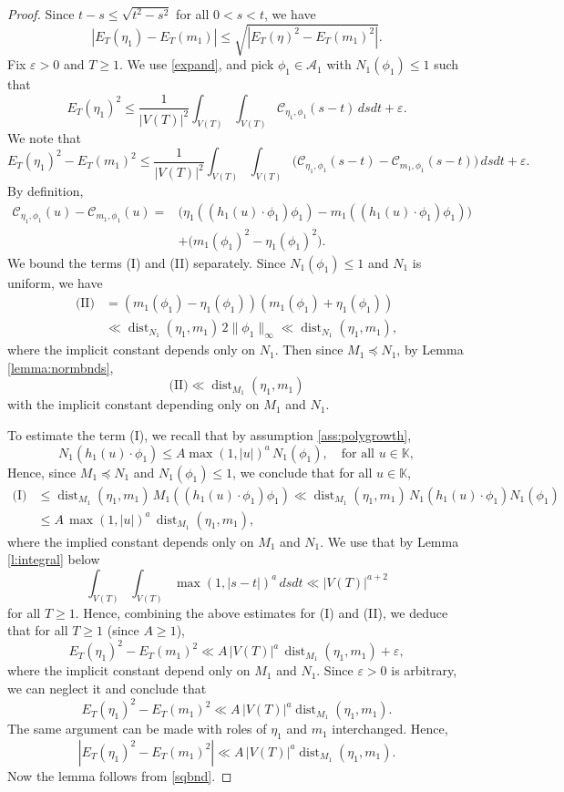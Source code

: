 \documentclass[11pt,reqno,a4paper]{amsart}
\numberwithin{equation}{section}
\newcommand{\cA}{\mathcal{A}}
\newcommand{\cC}{\mathcal{C}}
\newcommand{\eps}{\varepsilon}
\DeclareMathOperator{\dist}{dist}
\theoremstyle{theorem}
\theoremstyle{definition}
\begin{document}
\begin{proof}
Since $t-s \leq \sqrt{t^2 - s^2}$ for all $0 < s < t$, we have
\begin{equation}
\label{sqbnd}
|E_T(\eta_1) - E_T(m_1)| \leq \sqrt{|E_T(\eta)^2 - E_T(m_1)^2|}.
\end{equation}
Fix $\eps > 0$ and $T \geq 1$. We use \eqref{expand}, and pick $\phi_1 \in \cA_1$ with $N_1(\phi_1) \leq 1$ such that
\[
E_T(\eta_1)^2 \leq \frac{1}{|V(T)|^2} \int_{V(T)} \int_{V(T)}\cC_{\eta_1,\phi_1}(s-t) \, ds dt + \eps.
\]
We note that
\[
E_T(\eta_1)^2 - E_T(m_1)^2 \leq \frac{1}{|V(T)|^2} \int_{V(T)} \int_{V(T)} \big(\cC_{\eta_1,\phi_1}(s-t) -\cC_{m_1,\phi_1}(s-t) \big) \, ds dt + \eps.
\]
By definition, 
\begin{align}
\cC_{\eta_1,\phi_1}(u) -\cC_{m_1,\phi_1}(u)
=&
\big( \eta_1((h_1(u) \cdot \phi_1) \phi_1) - m_1((h_1(u) \cdot \phi_1) \phi_1) \big) \tag{I} \\
&+
\big( m_1(\phi_1)^2 - \eta_1(\phi_1)^2 \big) \tag{II}.
\end{align}
We bound the terms (I) and (II) separately.
Since $N_1(\phi_1) \leq 1$ and $N_1$ is uniform, we have
\begin{align*}
\textrm{(II)}&= (m_1(\phi_1) - \eta_1(\phi_1))(m_1(\phi_1)+ \eta_1(\phi_1))\\
&\ll \dist_{N_1}(\eta_1,m_1)\, 2\|\phi_1\|_\infty \ll \dist_{N_1}(\eta_1,m_1),
\end{align*}
where the implicit constant depends only on $N_1$.
Then since $M_1 \preceq N_1$, by Lemma \ref{lemma:normbnds},
\begin{equation}
\label{eq:II}
\textrm{(II)} \ll \dist_{M_1}(\eta_1,m_1)
\end{equation}
with the implicit constant depending only on $M_1$ and $N_1$.

To estimate the term (I), we recall that by assumption \eqref{ass:polygrowth}, 
\[
N_1(h_1(u) \cdot \phi_1) \le A \max(1,|u|)^a\, N_1(\phi_1), \quad \textrm{for all $u\in\mathbb{K}$},
\]
Hence, since $M_1 \preceq N_1$ and $N_1(\phi_1) \leq 1$, we conclude that for all $u\in\mathbb{K}$,
\begin{align}\label{eq:I}
\textrm{(I)} &\leq \dist_{M_1}(\eta_1,m_1) \, M_1((h_1(u)\cdot  \phi_1)\phi_1) \ll 
\dist_{M_1}(\eta_1,m_1)\,N_1(h_1(u) \cdot \phi_1) N_1(\phi_1) \\
&\le A\, \max(1,|u|)^a \, \dist_{M_1}(\eta_1,m_1),\nonumber
\end{align}
where the implied constant depends only on $M_1$ and $N_1$.
We use that by Lemma \ref{l:integral} below
$$
\int_{V(T)}\int_{V(T)} \max(1,|s-t|)^a\, dsdt\ll |V(T)|^{a+2}
$$
for all $T\ge 1$. Hence, combining the above estimates for (I) and (II),
we deduce that for all $T \geq 1$ (since $A\ge 1$),
\[
E_T(\eta_1)^2 - E_T(m_1)^2 \ll A\, |V(T)|^a \, \dist_{M_1}(\eta_1,m_1) + \eps,
\]
where the implicit constant depend only on $M_1$ and $N_1$. Since $\eps > 0$ is arbitrary, we can 
neglect it and conclude that
\[
E_T(\eta_1)^2 - E_T(m_1)^2 \ll A\, |V(T)|^{a} \dist_{M_1}(\eta_1,m_1).
\]
The same argument can be made with roles of $\eta_1$ and $m_1$ interchanged.
Hence,
\[
|E_T(\eta_1)^2 - E_T(m_1)^2| \ll A\, |V(T)|^{a} \dist_{M_1}(\eta_1,m_1).
\]
Now the lemma follows from \eqref{sqbnd}.
\end{proof}
\end{document}

